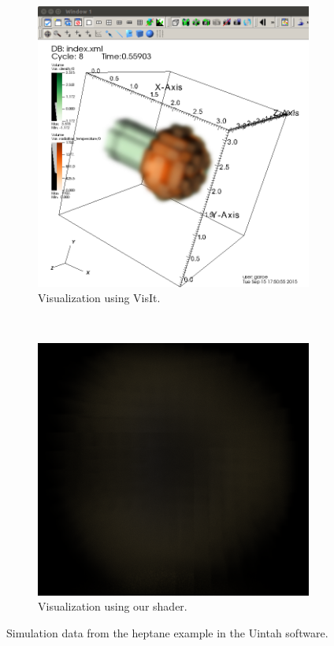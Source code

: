 \begin{figure}[htpb]
		\begin{subfigure}[t]{0.45\textwidth}
                \includegraphics[width=\textwidth]{img/pegoraro_data_visit}
                \caption{Visualization using VisIt.}
                \label{fig:pegoraro_data_simulation_visit}
        \end{subfigure}%
		~
 		\begin{subfigure}[t]{0.45\textwidth}
                \includegraphics[width=\textwidth]{img/result_pegoraro_data_test}
                \caption{Visualization using our shader.}
                \label{fig:result_pegoraro_data_test}
        \end{subfigure}%
        \caption{Simulation data from the heptane example in the Uintah software\cite{Uintah}.}
        \label{fig:pegoraro_data_simulation_overview}
\end{figure}


